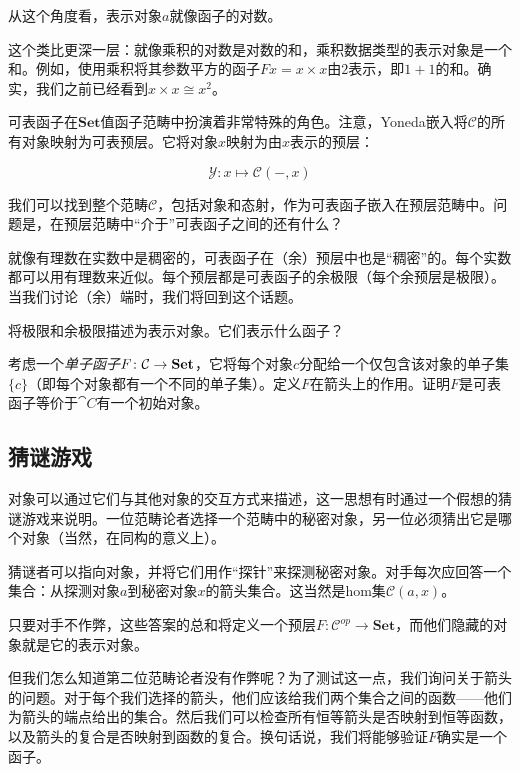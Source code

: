 \documentclass[DaoFP]{subfiles}
\begin{document}
从这个角度看，表示对象$a$就像函子的对数。

这个类比更深一层：就像乘积的对数是对数的和，乘积数据类型的表示对象是一个和。例如，使用乘积将其参数平方的函子$F x = x \times x$由$2$表示，即$1 + 1$的和。确实，我们之前已经看到$x \times x \cong x^2$。

可表函子在$\mathbf{Set}$值函子范畴中扮演着非常特殊的角色。注意，Yoneda嵌入将$\mathcal{C}$的所有对象映射为可表预层。它将对象$x$映射为由$x$表示的预层：

\[  \mathcal{Y} \colon x \mapsto \mathcal{C}(-, x) \]

我们可以找到整个范畴$\mathcal{C}$，包括对象和态射，作为可表函子嵌入在预层范畴中。问题是，在预层范畴中“介于”可表函子之间的还有什么？

就像有理数在实数中是稠密的，可表函子在（余）预层中也是“稠密”的。每个实数都可以用有理数来近似。每个预层都是可表函子的余极限（每个余预层是极限）。当我们讨论（余）端时，我们将回到这个话题。

\begin{exercise}
将极限和余极限描述为表示对象。它们表示什么函子？
\end{exercise}
\begin{exercise}
考虑一个\emph{单子函子}$F \colon \mathcal{C} \to \mathbf{Set}$，它将每个对象$c$分配给一个仅包含该对象的单子集$\{c\}$（即每个对象都有一个不同的单子集）。定义$F$在箭头上的作用。证明$F$是可表函子等价于$\cat C$有一个初始对象。
\end{exercise}

\subsection{猜谜游戏}

对象可以通过它们与其他对象的交互方式来描述，这一思想有时通过一个假想的猜谜游戏来说明。一位范畴论者选择一个范畴中的秘密对象，另一位必须猜出它是哪个对象（当然，在同构的意义上）。

猜谜者可以指向对象，并将它们用作“探针”来探测秘密对象。对手每次应回答一个集合：从探测对象$a$到秘密对象$x$的箭头集合。这当然是hom集$\mathcal{C}(a, x)$。

只要对手不作弊，这些答案的总和将定义一个预层$F \colon \mathcal{C}^{op} \to \mathbf{Set}$，而他们隐藏的对象就是它的表示对象。

但我们怎么知道第二位范畴论者没有作弊呢？为了测试这一点，我们询问关于箭头的问题。对于每个我们选择的箭头，他们应该给我们两个集合之间的函数——他们为箭头的端点给出的集合。然后我们可以检查所有恒等箭头是否映射到恒等函数，以及箭头的复合是否映射到函数的复合。换句话说，我们将能够验证$F$确实是一个函子。
\end{document}
